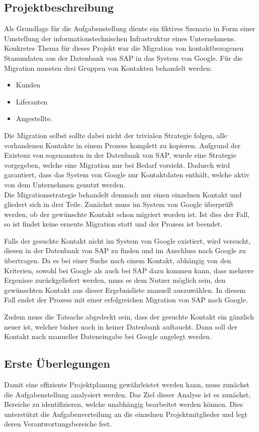 \subsection{Projektbeschreibung}
Als Grundlage für die Aufgabenstellung diente ein fiktives Szenario in Form einer Umstellung der
 informationstechnischen Infrastruktur eines Unternehmens. Konkretes Thema für dieses Projekt war die
 Migration von kontaktbezogenen Stammdaten aus der Datenbank von SAP in das System von Google.
Für die Migration mussten drei Gruppen von Kontakten behandelt werden:
\begin{itemize}
	\item Kunden
	\item Liferanten
	\item Angestellte.
\end{itemize}
Die Migration selbst sollte dabei nicht der trivialen Strategie folgen, alle vorhandenen Kontakte
 in einem Prozess komplett zu kopieren.
Aufgrund der Existenz von sogenannten  in der Datenbank von SAP, wurde
 eine Strategie vorgegeben, welche eine Migration nur bei Bedarf vorsieht.
Dadurch wird garantiert, dass das System von Google nur Kontaktdaten enthält, welche aktiv von dem
 Unternehmen genutzt werden.\\
Die Migrationsstrategie behandelt demnach nur einen einzelnen Kontakt und gliedert sich in drei Teile.
Zunächst muss im System von Google überprüft werden, ob der gewünschte Kontakt schon migriert worden ist.
Ist dies der Fall, so ist findet keine erneute Migration statt und der Prozess ist beendet.

Falls der gesuchte Kontakt nicht im System von Google existiert, wird versucht, diesen in der Datenbank
 von SAP zu finden und im Anschluss nach Google zu übertragen.
Da es bei einer Suche nach einem Kontakt, abhängig von den Kriterien, sowohl bei Google als auch bei SAP
 dazu kommen kann, dass mehrere Ergenisse zurückgeliefert werden, muss es dem Nutzer möglich sein, den
 gewünschten Kontakt aus dieser Ergebnisliste manuell auszuwählen.
In diesem Fall endet der Prozess mit einer erfolgreichen Migration von SAP nach Google.

Zudem muss die Tatsache abgedeckt sein, dass der gesuchte Kontakt ein gänzlich neuer ist, welcher bisher
 noch in keiner Datenbank auftaucht. Dann soll der Kontakt nach manueller Dateneingabe bei Google angelegt werden.

\subsection{Erste Überlegungen}
Damit eine effiziente Projektplanung gewährleistet werden kann, muss zunächst die Aufgabenstellung
 analysiert werden.
Das Ziel dieser Analyse ist es zunächst, Bereiche zu identifizieren, welche unabhängig bearbeitet werden können.
Dies unterstützt die Aufgabenverteilung an die einzelnen Projektmitglieder und legt deren Verantwortungsbereiche fest.

